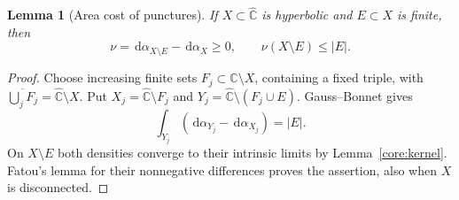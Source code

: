\documentclass[10pt,a4paper]{amsart}
\newcommand{\sphere}{\widehat{\mathbb C}}
\newcommand{\dd}{\,\mathrm d}
\newtheorem{lemma}[theorem]{Lemma}
\numberwithin{equation}{section}
\begin{document}
\begin{lemma}[Area cost of punctures]\label{core:puncture}
If $X\subset\sphere$ is hyperbolic and $E\subset X$ is finite, then
\[
 \nu=\dd\alpha_{X\setminus E}-\dd\alpha_X\ge0,
 \qquad \nu(X\setminus E)\le |E|.
\]
\end{lemma}
\begin{proof}
Choose increasing finite sets $F_j\subset\sphere\setminus X$,
containing a fixed triple, with
$\overline{\bigcup_jF_j}=\sphere\setminus X$. Put
$X_j=\sphere\setminus F_j$ and
$Y_j=\sphere\setminus(F_j\cup E)$. Gauss--Bonnet gives
\[
 \int_{Y_j}(\dd\alpha_{Y_j}-\dd\alpha_{X_j})=|E|.
\]
On $X\setminus E$ both densities converge to their intrinsic limits by
Lemma~\ref{core:kernel}. Fatou's lemma for their nonnegative differences
proves the assertion, also when $X$ is disconnected.
\end{proof}
\end{document}
